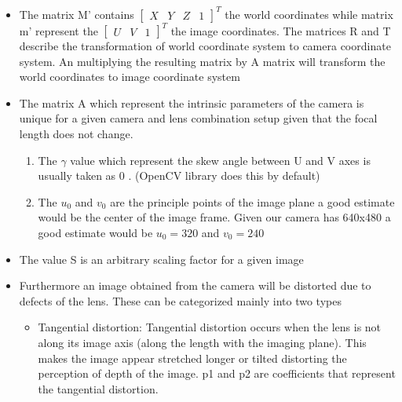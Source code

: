 \begin{itemize}
            \item The matrix M' contains $\begin{bmatrix}X&Y& Z& 1\end{bmatrix}^T$  the world coordinates while matrix m' represent the $\begin{bmatrix}U& V & 1\end{bmatrix}^T$ the image coordinates. The matrices R and T describe the transformation of world coordinate system to camera coordinate system. An multiplying the resulting matrix by A matrix will transform the world coordinates to image coordinate system
            
            \item The matrix A which represent the intrinsic parameters of the camera is unique for a given camera and lens combination setup given that the focal length does not change.
                \begin{enumerate}
                    \item The $\gamma$ value which represent the skew angle between U and V axes is usually taken as 0 . (OpenCV library does this by default)
                    \item The $u_0$ and $v_0$ are the principle points of the image plane a good estimate would be the center of the image frame. Given our camera has 640x480 a good estimate would be $u_0=320$ and $v_0=240$ 
                \end{enumerate}
            
            \item The value S is an arbitrary scaling factor for a given image
            
            
            \item  Furthermore an image obtained from the camera will be distorted due to defects of the lens. These can be  categorized mainly into two  types
                        
                        
                        \begin{itemize}
                            \item Tangential distortion: Tangential distortion occurs when the lens is not along its image axis (along the length with the imaging plane). This makes the image appear stretched longer or tilted distorting the perception of depth of the image. 
                            p1 and p2 are coefficients that represent the tangential distortion. 
                            

\end{itemize}
\end{itemize}

